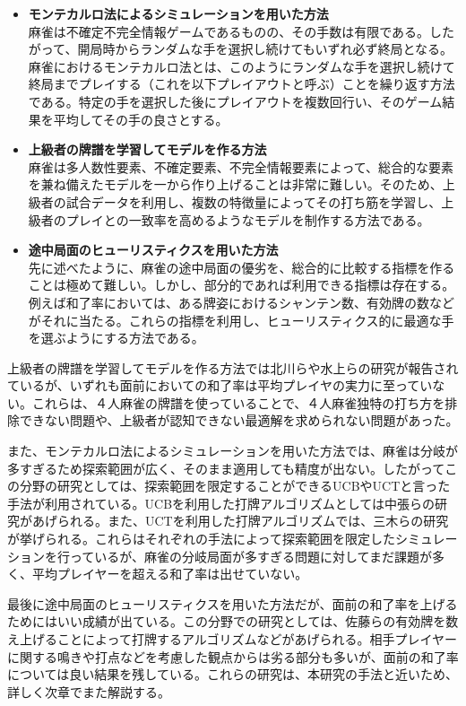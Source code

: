 \begin{itemize}
 \item {\bf モンテカルロ法によるシミュレーションを用いた方法} \mbox{}\\ 
 	麻雀は不確定不完全情報ゲームであるものの、その手数は有限である。したがって、開局時からランダムな手を選択し続けてもいずれ必ず終局となる。麻雀におけるモンテカルロ法とは、このようにランダムな手を選択し続けて終局までプレイする（これを以下プレイアウトと呼ぶ）ことを繰り返す方法である。特定の手を選択した後にプレイアウトを複数回行い、そのゲーム結果を平均してその手の良さとする。
 \item {\bf 上級者の牌譜を学習してモデルを作る方法} \mbox{}\\
 	麻雀は多人数性要素、不確定要素、不完全情報要素によって、総合的な要素を兼ね備えたモデルを一から作り上げることは非常に難しい。そのため、上級者の試合データを利用し、複数の特徴量によってその打ち筋を学習し、上級者のプレイとの一致率を高めるようなモデルを制作する方法である。
 \item {\bf 途中局面のヒューリスティクスを用いた方法} \mbox{}\\ 
 	先に述べたように、麻雀の途中局面の優劣を、総合的に比較する指標を作ることは極めて難しい。しかし、部分的であれば利用できる指標は存在する。例えば和了率においては、ある牌姿におけるシャンテン数、有効牌の数などがそれに当たる。これらの指標を利用し、ヒューリスティクス的に最適な手を選ぶようにする方法である。
\end{itemize}

上級者の牌譜を学習してモデルを作る方法では北川ら\cite{kitakawa}や水上ら\cite{bakuuti2013}の研究が報告されているが、いずれも面前においての和了率は平均プレイヤの実力に至っていない。これらは、４人麻雀の牌譜を使っていることで、４人麻雀独特の打ち方を排除できない問題や、上級者が認知できない最適解を求められない問題があった。

また、モンテカルロ法によるシミュレーションを用いた方法では、麻雀は分岐が多すぎるため探索範囲が広く、そのまま適用しても精度が出ない。したがってこの分野の研究としては、探索範囲を限定することができるUCB\cite{UCB}やUCT\cite{UCT}と言った手法が利用されている。UCBを利用した打牌アルゴリズムとしては中張らの研究が\cite{LinUCB_mahjong}あげられる。また、UCTを利用した打牌アルゴリズムでは、三木らの研究が\cite{miki}挙げられる。これらはそれぞれの手法によって探索範囲を限定したシミュレーションを行っているが、麻雀の分岐局面が多すぎる問題に対してまだ課題が多く、平均プレイヤーを超える和了率は出せていない。

最後に途中局面のヒューリスティクスを用いた方法だが、面前の和了率を上げるためにはいい成績が出ている。この分野での研究としては、佐藤らの有効牌を数え上げることによって打牌するアルゴリズム\cite{zentsu}などがあげられる。相手プレイヤーに関する鳴きや打点などを考慮した観点からは劣る部分も多いが、面前の和了率については良い結果を残している。これらの研究は、本研究の手法と近いため、詳しく次章でまた解説する。

